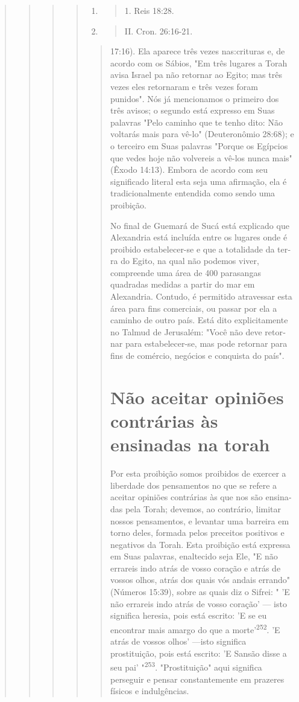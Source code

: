 \begin{quote}
\begin{quote}
\begin{quote}
\begin{quote}
\begin{enumerate}
\def\labelenumi{\arabic{enumi}.}
\setcounter{enumi}{249}
\item
 \begin{quote}
 1. Reis 18:28.
 \end{quote}
\item
 \begin{quote}
 II. Cron. 26:16-21.
 \end{quote}
\end{enumerate}

\begin{quote}
17:16). Ela aparece três vezes nas:crituras e, de acordo com os Sábios,
"Em três lugares a Torah avisa Israel pa não retornar ao Egito; mas três
vezes eles retornaram e três vezes foram punidos". Nós já mencionamos o
primeiro dos três avisos; o segundo está expresso em Suas palavras "Pelo
caminho que te tenho dito: Não voltarás mais para vê-lo" (Deuteronômio
28:68); e o terceiro em Suas palavras "Porque os Egípcios que vedes hoje
não volvereis a vê-los nunca mais" (Êxodo 14:13). Embora de acordo com
seu significado literal esta seja uma afirmação, ela é tradicionalmente
entendida como sendo uma proibição.

No final de Guemará de Sucá está explicado que Alexandria está in­cluída
entre os lugares onde é proibido estabelecer-se e que a totalidade da
ter­ra do Egito, na qual não podemos viver, compreende uma área de 400
parasan­gas quadradas medidas a partir do mar em Alexandria. Contudo, é
permitido atravessar esta área para fins comerciais, ou passar por ela a
caminho de outro país. Está dito explicitamente no Talmud de Jerusalém:
"Você não deve retor­nar para estabelecer-se, mas pode retornar para
fins de comércio, negócios e conquista do país".

\section{Não aceitar opiniões contrárias às ensinadas na torah}

Por esta proibição somos proibidos de exercer a liberdade dos
pen­samentos no que se refere a aceitar opiniões contrárias às que nos
são ensina­das pela Torah; devemos, ao contrário, limitar nossos
pensamentos, e levantar uma barreira em torno deles, formada pelos
preceitos positivos e negativos da Torah. Esta proibição está expressa
em Suas palavras, enaltecido seja Ele, "E não errareis indo atrás de
vosso coração e atrás de vossos olhos, atrás dos quais vós andais
errando" (Números 15:39), sobre as quais diz o Sifrei: " 'E não
erra­reis indo atrás de vosso coração' --- isto significa heresia, pois
está escrito: 'E se eu encontrar mais amargo do que a
morte'\textsuperscript{252}. 'E atrás de vossos olhos' ---isto significa
prostituição, pois está escrito: 'E Sansão disse a seu pai'
"\textsuperscript{253}. "Prostituição" aqui significa perseguir e pensar
constantemente em prazeres físicos e indulgências.


\end{quote}
\end{quote}
\end{quote}
\end{quote}
\end{quote}
